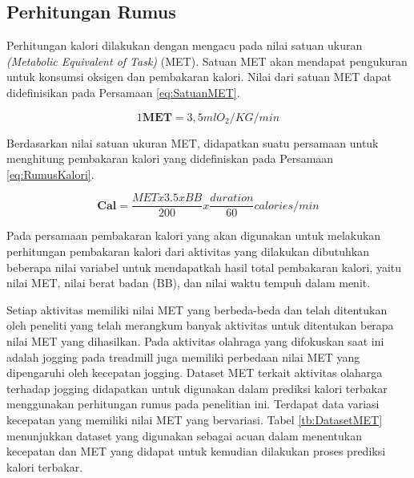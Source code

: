 \subsection{Perhitungan Rumus}
\label{subsec:PrediksiPerhitungan}

Perhitungan kalori dilakukan dengan mengacu pada nilai satuan ukuran \emph{(Metabolic Equivalent of Task)} (MET). Satuan MET akan mendapat pengukuran untuk konsumsi oksigen dan pembakaran kalori. Nilai dari satuan MET dapat didefinisikan pada Persamaan \ref{eq:SatuanMET}.

\begin{equation}
  \label{eq:SatuanMET}
  1 \mathbf{MET} = 3,5 ml O_2  / KG / min
\end{equation}

Berdasarkan nilai satuan ukuran MET, didapatkan suatu persamaan untuk menghitung pembakaran kalori yang didefiniskan pada Persamaan \ref{eq:RumusKalori}.

\begin{equation}
  \label{eq:RumusKalori}
  \mathbf{Cal} = \frac{MET  x 3.5 x BB}{200} x \frac{duration}{60} calories / min
\end{equation}

Pada persamaan pembakaran kalori yang akan digunakan untuk melakukan perhitungan pembakaran kalori dari aktivitas yang dilakukan dibutuhkan beberapa nilai variabel untuk mendapatkah hasil total pembakaran kalori, yaitu nilai MET, nilai berat badan (BB), dan nilai waktu tempuh dalam menit.

Setiap aktivitas memiliki nilai MET yang berbeda-beda dan telah ditentukan oleh peneliti yang telah merangkum banyak aktivitas untuk ditentukan berapa nilai MET yang dihasilkan. Pada aktivitas olahraga yang difokuskan saat ini adalah jogging pada treadmill juga memiliki perbedaan nilai MET yang dipengaruhi oleh kecepatan jogging. Dataset MET terkait aktivitas olaharga terhadap jogging didapatkan untuk digunakan dalam prediksi kalori terbakar menggunakan perhitungan rumus pada penelitian ini. Terdapat data variasi kecepatan yang memiliki nilai MET yang bervariasi. Tabel \ref{tb:DatasetMET} menunjukkan dataset yang digunakan sebagai acuan dalam menentukan kecepatan dan MET yang didapat untuk kemudian dilakukan proses prediksi kalori terbakar.

